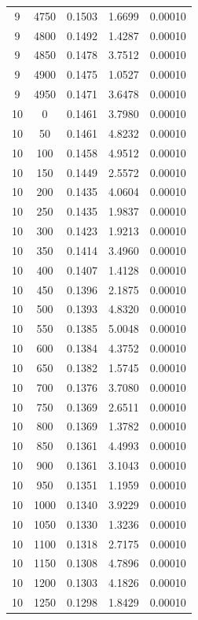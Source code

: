 \begin{longtable}{ccccc}
    9 & 4750 & 0.1503 & 1.6699 & 0.00010 \\
    9 & 4800 & 0.1492 & 1.4287 & 0.00010 \\
    9 & 4850 & 0.1478 & 3.7512 & 0.00010 \\
    9 & 4900 & 0.1475 & 1.0527 & 0.00010 \\
    9 & 4950 & 0.1471 & 3.6478 & 0.00010 \\
    10 & 0 & 0.1461 & 3.7980 & 0.00010 \\
    10 & 50 & 0.1461 & 4.8232 & 0.00010 \\
    10 & 100 & 0.1458 & 4.9512 & 0.00010 \\
    10 & 150 & 0.1449 & 2.5572 & 0.00010 \\
    10 & 200 & 0.1435 & 4.0604 & 0.00010 \\
    10 & 250 & 0.1435 & 1.9837 & 0.00010 \\
    10 & 300 & 0.1423 & 1.9213 & 0.00010 \\
    10 & 350 & 0.1414 & 3.4960 & 0.00010 \\
    10 & 400 & 0.1407 & 1.4128 & 0.00010 \\
    10 & 450 & 0.1396 & 2.1875 & 0.00010 \\
    10 & 500 & 0.1393 & 4.8320 & 0.00010 \\
    10 & 550 & 0.1385 & 5.0048 & 0.00010 \\
    10 & 600 & 0.1384 & 4.3752 & 0.00010 \\
    10 & 650 & 0.1382 & 1.5745 & 0.00010 \\
    10 & 700 & 0.1376 & 3.7080 & 0.00010 \\
    10 & 750 & 0.1369 & 2.6511 & 0.00010 \\
    10 & 800 & 0.1369 & 1.3782 & 0.00010 \\
    10 & 850 & 0.1361 & 4.4993 & 0.00010 \\
    10 & 900 & 0.1361 & 3.1043 & 0.00010 \\
    10 & 950 & 0.1351 & 1.1959 & 0.00010 \\
    10 & 1000 & 0.1340 & 3.9229 & 0.00010 \\
    10 & 1050 & 0.1330 & 1.3236 & 0.00010 \\
    10 & 1100 & 0.1318 & 2.7175 & 0.00010 \\
    10 & 1150 & 0.1308 & 4.7896 & 0.00010 \\
    10 & 1200 & 0.1303 & 4.1826 & 0.00010 \\
    10 & 1250 & 0.1298 & 1.8429 & 0.00010 \\

\end{longtable}
